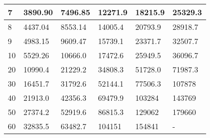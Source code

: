 \begin{table}[h]
\begin{tabular}{|l|l|l|l|l|l|}
7                                                                          & 3890.90                              & 7496.85                               & 12271.9                               & 18215.9                               & 25329.3                               \\ \hline
8                                                                          & 4437.04                              & 8553.14                               & 14005.4                               & 20793.9                               & 28918.7                               \\ \hline
9                                                                          & 4983.15                              & 9609.47                               & 15739.1                               & 23371.7                               & 32507.7                               \\ \hline
10                                                                         & 5529.26                              & 10666.0                               & 17472.6                               & 25949.5                               & 36096.7                               \\ \hline
20                                                                         & 10990.4                              & 21229.2                               & 34808.3                               & 51728.0                               & 71987.3                               \\ \hline
30                                                                         & 16451.7                              & 31792.6                               & 52144.1                               & 77506.3                               & 107878                                \\ \hline
40                                                                         & 21913.0                              & 42356.3                               & 69479.9                               & 103284                                & 143769                                \\ \hline
50                                                                         & 27374.2                              & 52919.6                               & 86815.3                               & 129062                                & 179660                                \\ \hline
60                                                                         & 32835.5                              & 63482.7                               & 104151                                & 154841                                & -                                     \\ \hline

\end{tabular}
\end{table}
